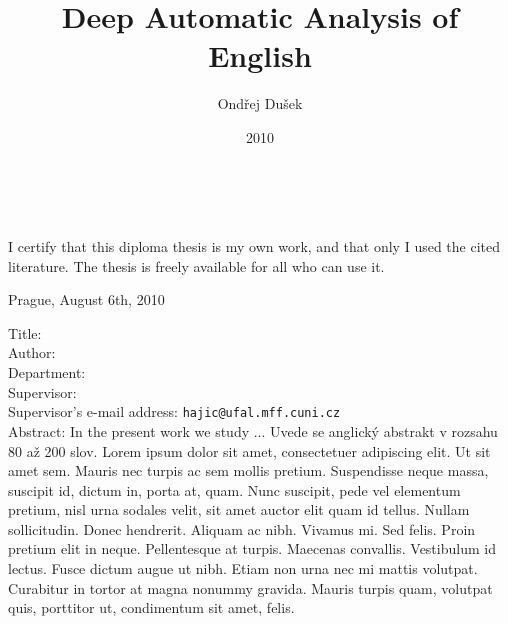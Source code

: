 \documentclass[12pt,notitlepage]{report}
\title{Deep Automatic Analysis of English}
\author{Ondřej Dušek}
\date{2010}
\def\fulldate{August 6th, 2010}
\begin{document}
\maketitle

\pagestyle{plain}
\normalsize %
\setcounter{page}{2} %
\cleardoublepage
\ \vspace{10mm} 

\noindent %
 
\vspace{\fill}
\noindent I certify that this diploma thesis is my own work, and that only I used the cited literature. The thesis is freely available for all who can use it.

 
\bigskip
\noindent Prague, \fulldate \hspace{\fill}\theauthor\\ %


\cleardoublepage
\tableofcontents %

\cleardoublepage %
\pagestyle{plain}
\noindent
Title: \thetitle\\
Author: \theauthor\\
Department: \thedept\\
Supervisor: \thesupervisor\\
Supervisor's e-mail address: \texttt{hajic@ufal.mff.cuni.cz}\\

\noindent Abstract: In the present work we study ... Uvede se anglický abstrakt v rozsahu 80 až 200 slov. Lorem ipsum dolor sit amet, consectetuer adipiscing elit. Ut sit amet sem. Mauris nec turpis ac sem mollis pretium. Suspendisse neque massa, suscipit id, dictum in, porta at, quam. Nunc suscipit, pede vel elementum pretium, nisl urna sodales velit, sit amet auctor elit quam id tellus. Nullam sollicitudin. Donec hendrerit. Aliquam ac nibh. Vivamus mi. Sed felis. Proin pretium elit in neque. Pellentesque at turpis. Maecenas convallis. Vestibulum id lectus. Fusce dictum augue ut nibh. Etiam non urna nec mi mattis volutpat. Curabitur in tortor at magna nonummy gravida. Mauris turpis quam, volutpat quis, porttitor ut, condimentum sit amet, felis. \\
\end{document}

